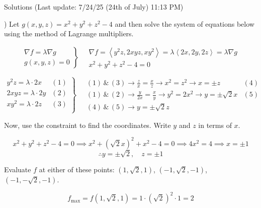 \documentclass{article}
\begin{document}
\newpage

\begin{center}
Solutions (Last update: 7/24/25 (24th of July) 11:13 PM)
\end{center}

) Let $g(x,y,z)=x^2+y^2+z^2-4$ and then solve the system of equations below using the method of Lagrange multipliers.

\[
\left.
\begin{array}{ll}
\displaystyle\nabla f =\lambda \nabla g \\
\displaystyle g(x,y,z) = 0
\end{array}
\right\}\quad
\begin{array}{ll}
\nabla f = \left\langle y^2z,2xyz,xy^2\right\rangle = \lambda\left\langle2x,2y,2z\right\rangle = \lambda\nabla g \\[0.2cm] x^2+y^2+z^2-4=0
\end{array}
\]

\[
\left.
\begin{array}{ll}
\displaystyle y^2z =\lambda \cdot2x & (1)\\[0.2cm]
\displaystyle 2xyz =\lambda \cdot2y & (2)\\[0.2cm]
\displaystyle xy^2 =\lambda \cdot2z & (3)\\[0.2cm]
\end{array}
\right\}\quad
\begin{array}{ll}
\displaystyle(1)\,\&\,(3)\rightarrow\frac{z}{x}=\frac{x}{z}\rightarrow x^2=z^2\rightarrow x=\pm z&(4)\\[0.4cm]
\displaystyle(1)\,\&\,(2)\rightarrow\frac{y}{2x}=\frac{x}{y}\rightarrow y^2=2x^2\rightarrow y=\pm\sqrt{2}x&(5)\\[0.4cm]\displaystyle(4)\,\&\,(5)\rightarrow y=\pm \sqrt 2z
\end{array}
\]

\hfill

\noindent Now, use the constraint to find the coordinates. Write $y$ and $z$ in terms of $x$.

\[x^2+y^2+z^2-4=0\implies x^2+\left(\sqrt2x\right)^2+x^2-4=0\implies4x^2=4\implies x=\pm1\]
\[\therefore y=\pm\sqrt2,\quad z=\pm1\]

\hfill

\noindent Evaluate $f$ at either of these points: $(1,\sqrt2,1)$, $(-1,\sqrt2,-1)$, $(-1,-\sqrt2,-1)$.

\[f_{\text{max}}=f(1,\sqrt2,1)=1\cdot\left(\sqrt2\right)^2\cdot1=\boxed{2}\]

\hfill
\end{document}
